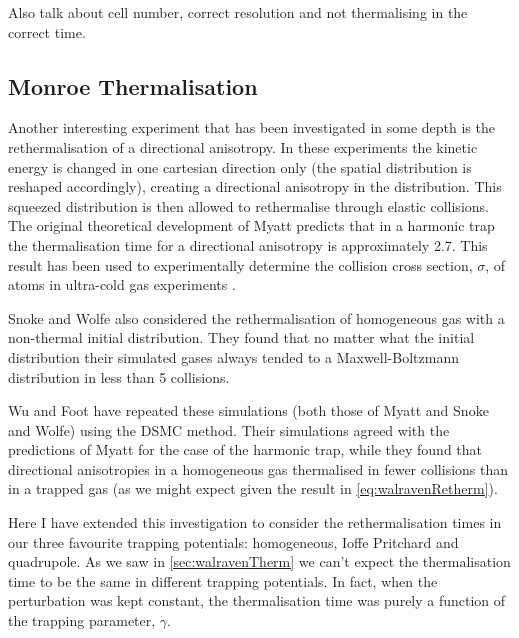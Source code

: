 Also talk about cell number, correct resolution and not thermalising in the correct time.

\subsection{Monroe Thermalisation}

Another interesting experiment that has been investigated in some depth is the rethermalisation of a directional anisotropy. 
In these experiments the kinetic energy is changed in one cartesian direction only (the spatial distribution is reshaped accordingly), creating a directional anisotropy in the distribution.
This squeezed distribution is then allowed to rethermalise through elastic collisions.
The original theoretical development of Myatt \cite{Myatt1997} predicts that in a harmonic trap the thermalisation time for a directional anisotropy is approximately 2.7.
This result has been used to experimentally determine the collision cross section, $\sigma$, of atoms in ultra-cold gas experiments \cite{Monroe1993, Davis1995}. 

Snoke and Wolfe \cite{Snoke1989} also considered the rethermalisation of homogeneous gas with a non-thermal initial distribution.
They found that no matter what the initial distribution their simulated gases always tended to a Maxwell-Boltzmann distribution in less than 5 collisions.

Wu and Foot \cite{Wu1996} have repeated these simulations (both those of Myatt and Snoke and Wolfe) using the DSMC method.
Their simulations agreed with the predictions of Myatt for the case of the harmonic trap, while they found that directional anisotropies in a homogeneous gas thermalised in fewer collisions than in a trapped gas (as we might expect given the result in \autoref{eq:walravenRetherm}).

Here I have extended this investigation to consider the rethermalisation times in our three favourite trapping potentials: homogeneous, Ioffe Pritchard and quadrupole.
As we saw in \autoref{sec:walravenTherm} we can't expect the thermalisation time to be the same in different trapping potentials.
In fact, when the perturbation was kept constant, the thermalisation time was purely a function of the trapping parameter, $\gamma$.

